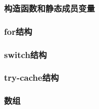 \subsubsection{构造函数和静态成员变量}
\subsubsection{for结构}
\subsubsection{switch结构}
\subsubsection{try-cache结构}
\subsubsection{数组}




